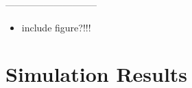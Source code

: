 \documentclass[a4paper]{jpconf}
\begin{document}
-----------------------------
\begin{itemize}
\item include figure?!!!
\end{itemize}



\section{Simulation Results}

\end{document}
